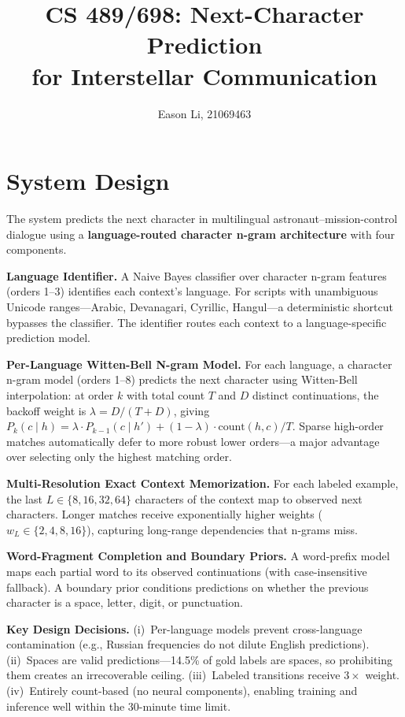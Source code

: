 \documentclass[11pt]{article}
\title{\vspace{-1.5em}CS 489/698: Next-Character Prediction \\ for Interstellar Communication\vspace{-0.5em}}
\author{Eason Li, 21069463}
\date{}
\begin{document}
\maketitle
\vspace{-2em}

\section{System Design}

The system predicts the next character in multilingual astronaut--mission-control dialogue using a \textbf{language-routed character n-gram architecture} with four components.

\textbf{Language Identifier.}
A Naive Bayes classifier over character n-gram features (orders 1--3) identifies each context's language. For scripts with unambiguous Unicode ranges---Arabic, Devanagari, Cyrillic, Hangul---a deterministic shortcut bypasses the classifier. The identifier routes each context to a language-specific prediction model.

\textbf{Per-Language Witten-Bell N-gram Model.}
For each language, a character n-gram model (orders 1--8) predicts the next character using Witten-Bell interpolation: at order $k$ with total count $T$ and $D$ distinct continuations, the backoff weight is $\lambda = D/(T+D)$, giving $P_k(c \mid h) = \lambda \cdot P_{k-1}(c \mid h') + (1-\lambda) \cdot \text{count}(h,c)/T$. Sparse high-order matches automatically defer to more robust lower orders---a major advantage over selecting only the highest matching order.

\textbf{Multi-Resolution Exact Context Memorization.}
For each labeled example, the last $L \in \{8, 16, 32, 64\}$ characters of the context map to observed next characters. Longer matches receive exponentially higher weights ($w_L \in \{2, 4, 8, 16\}$), capturing long-range dependencies that n-grams miss.

\textbf{Word-Fragment Completion and Boundary Priors.}
A word-prefix model maps each partial word to its observed continuations (with case-insensitive fallback). A boundary prior conditions predictions on whether the previous character is a space, letter, digit, or punctuation.

\textbf{Key Design Decisions.}
(i)~Per-language models prevent cross-language contamination (e.g., Russian frequencies do not dilute English predictions).
(ii)~Spaces are valid predictions---14.5\% of gold labels are spaces, so prohibiting them creates an irrecoverable ceiling.
(iii)~Labeled transitions receive $3\times$ weight.
(iv)~Entirely count-based (no neural components), enabling training and inference well within the 30-minute time limit.
\end{document}
